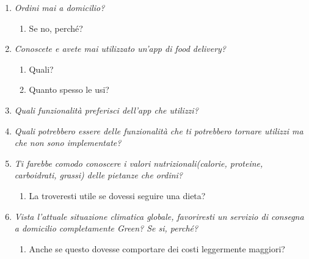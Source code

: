 \documentclass{article}
\begin{document}
    \begin{enumerate}
    
    \item \textit{Ordini mai a domicilio?}
        \begin{enumerate}
            \item Se no, perché?
        \end{enumerate}
    \item \textit{Conoscete e avete mai utilizzato un'app di food delivery?}
    \begin{enumerate}
        \item Quali?
        \item Quanto spesso le usi?
    \end{enumerate}
    \item \textit{Quali funzionalità preferisci dell'app che utilizzi?}
    \item \textit{Quali potrebbero essere delle funzionalità che ti potrebbero tornare utilizzi ma che non sono implementate?}
    \item \textit{Ti farebbe comodo conoscere i valori nutrizionali(calorie, proteine, carboidrati, grassi) delle pietanze che ordini?}
    \begin{enumerate}
        \item La troveresti utile se dovessi seguire una dieta?
    \end{enumerate}
    \item \textit{Vista l'attuale situazione climatica globale, favoriresti un servizio di consegna a domicilio completamente Green? Se si, perché? }
    \begin{enumerate}
        \item Anche se questo dovesse comportare dei costi leggermente maggiori?
    \end{enumerate}
\end{enumerate}
\end{document}
